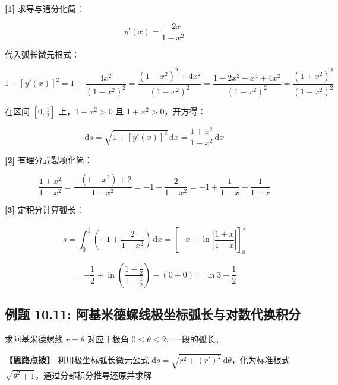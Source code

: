 \documentclass[11pt,a4paper,UTF8]{ctexart}
\begin{document}
\begin{solbox}[分步推导与答题规范]
\textbf{[1]} 求导与通分化简：


\begin{equation*}
y'(x) = \frac{-2x}{1-x^2}
\end{equation*}


代入弧长微元根式：


\begin{equation*}
1 + [y'(x)]^2 = 1 + \frac{4x^2}{(1-x^2)^2} = \frac{(1-x^2)^2 + 4x^2}{(1-x^2)^2} = \frac{1 - 2x^2 + x^4 + 4x^2}{(1-x^2)^2} = \frac{(1+x^2)^2}{(1-x^2)^2}
\end{equation*}


在区间 $\left[0, \frac{1}{2}\right]$ 上，$1-x^2 > 0$ 且 $1+x^2 > 0$，开方得：


\begin{equation*}
\mathrm{d}s = \sqrt{1+[y'(x)]^2}\,\mathrm{d}x = \frac{1+x^2}{1-x^2}\,\mathrm{d}x
\end{equation*}


\textbf{[2]} 有理分式裂项化简：


\begin{equation*}
\frac{1+x^2}{1-x^2} = \frac{-(1-x^2) + 2}{1-x^2} = -1 + \frac{2}{1-x^2} = -1 + \frac{1}{1-x} + \frac{1}{1+x}
\end{equation*}


\textbf{[3]} 定积分计算弧长：


\begin{equation*}
s = \int_0^{\frac{1}{2}} \left(-1 + \frac{2}{1-x^2}\right)\,\mathrm{d}x = \left[-x + \ln\left|\frac{1+x}{1-x}\right|\right]_0^{\frac{1}{2}}
\end{equation*}



\begin{equation*}
= -\frac{1}{2} + \ln\left(\frac{1+\frac{1}{2}}{1-\frac{1}{2}}\right) - (0 + 0) = \ln 3 - \frac{1}{2}
\end{equation*}

\end{solbox}


\subsection{例题 10.11: 阿基米德螺线极坐标弧长与对数代换积分}

求阿基米德螺线 $r = \theta$ 对应于极角 $0 \leqslant \theta \leqslant 2\pi$ 一段的弧长。

\textbf{\color{DeepPurple}【思路点拨】} 利用极坐标弧长微元公式 $\mathrm{d}s = \sqrt{r^2 + (r')^2}\,\mathrm{d}\theta$，化为标准根式 $\sqrt{\theta^2+1}$，通过分部积分推导还原并求解
\end{document}
